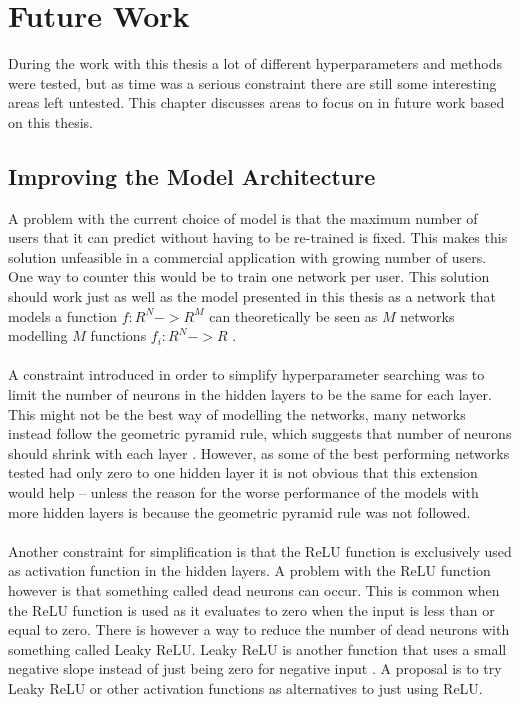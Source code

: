 \chapter{Future Work}\label{chap:future_work}
During the work with this thesis a lot of different hyperparameters and methods were tested, but as time was a serious constraint there are still some interesting areas left untested. This chapter discusses areas to focus on in future work based on this thesis.

\section{Improving the Model Architecture}\label{sec:improving_arch}
A problem with the current choice of model is that the maximum number of users that it can predict without having to be re-trained is fixed. This makes this solution unfeasible in a commercial application with growing number of users. One way to counter this would be to train one network per user. This solution should work just as well as the model presented in this thesis as a network that models a function $f:R^N->R^M$ can theoretically be seen as $M$ networks modelling $M$ functions $f_i:R^N->R$ \parencite{leshno1993multilayer}.
\\\\
A constraint introduced in order to simplify hyperparameter searching was to limit the number of neurons in the hidden layers to be the same for each layer. This might not be the best way of modelling the networks, many networks instead follow the geometric pyramid rule, which suggests that number of neurons should shrink with each layer \parencite{masters1993practical}. However, as some of the best performing networks tested had only zero to one hidden layer it is not obvious that this extension would help -- unless the reason for the worse performance of the models with more hidden layers is because the geometric pyramid rule was not followed.
\\\\
Another constraint for simplification is that the ReLU function is exclusively used as activation function in the hidden layers. A problem with the ReLU function however is that something called dead neurons can occur. This is common when the ReLU function is used as it evaluates to zero when the input is less than or equal to zero. There is however a way to reduce the number of dead neurons with something called Leaky ReLU. Leaky ReLU is another function that uses a small negative slope instead of just being zero for negative input \parencite{maas2013rectifier}. A proposal is to try Leaky ReLU or other activation functions as alternatives to just using ReLU.

